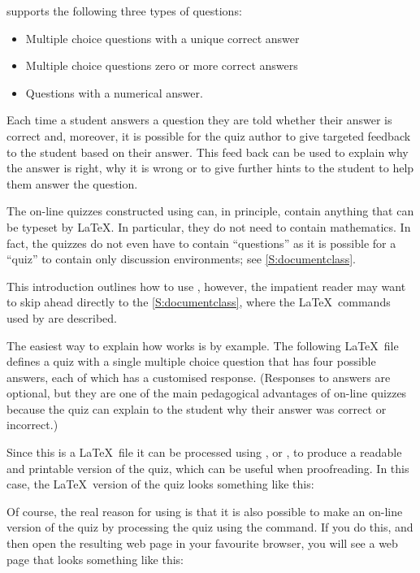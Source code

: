 \documentclass[svgnames]{article}
\begin{document}
    \WebQuiz supports the following three types of questions:
    \begin{itemize}
      \item Multiple choice questions with a unique correct answer
      \item Multiple choice questions zero or more correct answers
      \item Questions with a numerical answer.
    \end{itemize}
    Each time a student answers a question they are told whether their
    answer is correct and, moreover, it is possible for the quiz author
    to give targeted feedback to the student based on their answer. This
    feed back can be used to explain why the answer is right, why it is
    wrong or to give further hints to the student to help them answer the
    question.

    The on-line quizzes constructed using \WebQuiz can, in principle,
    contain anything that can be typeset by \LaTeX. In particular, they
    do not need to contain mathematics. In fact, the quizzes do not even
    have to contain ``questions'' as it is possible for a \WebQuiz
    ``quiz'' to contain only \textsf{discussion} environments; see
    \autoref{S:documentclass}.

    This introduction outlines how to use \WebQuiz, however, the
    impatient reader may want to skip ahead directly to the
    \autoref{S:documentclass}, where the \LaTeX\ commands used by
    \WebQuiz are described.

    The easiest way to explain how \WebQuiz works is by example. The
    following \LaTeX\ file defines a quiz with a single multiple choice
    question that has four possible answers, each of which has a
    customised response.  (Responses to answers are optional, but they
    are one of the main pedagogical advantages of on-line quizzes
    because the quiz can explain to the student why their answer was
    correct or incorrect.)


    Since this is a \LaTeX\ file it can be processed using
    , or , to produce a readable and
    printable version of the quiz, which can be useful when
    proofreading. In this case, the \LaTeX\ version of the quiz looks
    something like this:


    Of course, the real reason for using \WebQuiz is that it is also
    possible to make an on-line version of the quiz by processing the
    quiz using the  command. If you do this, and then open
    the resulting web page in your favourite browser, you will see a web page
    that looks something like this:
\end{document}
